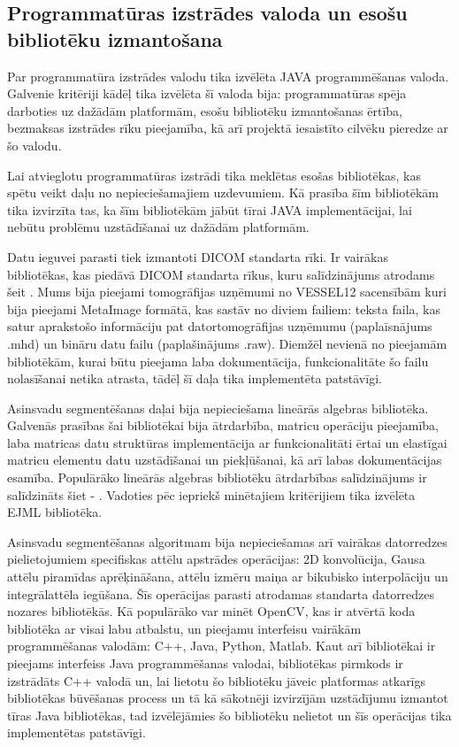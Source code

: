 \subsection{Programmatūras izstrādes valoda un esošu bibliotēku izmantošana}

Par programmatūra izstrādes valodu tika izvēlēta JAVA programmēšanas valoda. Galvenie kritēriji kādēļ tika izvēlēta šī valoda bija: programmatūras spēja darboties uz dažādām platformām, esošu bibliotēku izmantošanas ērtība, bezmaksas izstrādes rīku pieejamība, kā arī projektā iesaistīto cilvēku pieredze ar šo valodu.

Lai atvieglotu programmatūras izstrādi tika meklētas esošas bibliotēkas, kas spētu veikt daļu no nepieciešamajiem uzdevumiem. Kā prasība šīm bibliotēkām tika izvirzīta tas, ka šīm bibliotēkām jābūt tīrai JAVA implementācijai, lai nebūtu problēmu uzstādīšanai uz dažādām platformām.

Datu ieguvei parasti tiek izmantoti DICOM standarta rīki. Ir vairākas bibliotēkas, kas piedāvā DICOM standarta rīkus, kuru salīdzinājums atrodams šeit \cite{dicombibcomp}. Mums bija pieejami tomogrāfijas uzņēmumi no VESSEL12 sacensībām kuri bija pieejami MetaImage formātā, kas sastāv no diviem failiem: teksta faila, kas satur aprakstošo informāciju pat datortomogrāfijas uzņēmumu (paplaīsnājums .mhd) un bināru datu failu (paplašinājums .raw). Diemžēl nevienā no pieejamām bibliotēkām, kurai būtu pieejama laba dokumentācija, funkcionalitāte šo failu nolasīšanai netika atrasta, tādēļ šī daļa tika implementēta patstāvīgi.

Asinsvadu segmentēšanas daļai bija nepieciešama lineārās algebras bibliotēka. Galvenās prasības šai bibliotēkai bija ātrdarbība, matricu operāciju pieejamība, laba matricas datu struktūras implementācija ar funkcionalitāti ērtai un elastīgai matricu elementu datu uzstādīšanai un piekļūšanai, kā arī labas dokumentācijas esamība. Populārāko lineārās algebras bibliotēku ātrdarbības salīdzinājums ir salīdzināts šiet - \cite{linearlibcomp}. Vadoties pēc iepriekš minētajiem kritērijiem tika izvēlēta EJML\cite{ejml} bibliotēka.

Asinsvadu segmentēšanas algoritmam bija nepieciešamas arī vairākas datorredzes pielietojumiem specifiskas attēlu apstrādes operācijas: 2D konvolūcija, Gausa attēlu piramīdas aprēķināšana, attēlu izmēru maiņa ar bikubisko interpolāciju un integrālattēla iegūšana. Šīs operācijas parasti atrodamas standarta datorredzes nozares bibliotēkās. Kā populārāko var minēt OpenCV\cite{opencv}, kas ir atvērtā koda bibliotēka ar visai labu atbalstu, un pieejamu interfeisu vairākām programmēšanas valodām: C++, Java, Python, Matlab. Kaut arī bibliotēkai ir pieejams interfeiss Java programmēšanas valodai, bibliotēkas pirmkods ir izstrādāts C++ valodā un, lai lietotu šo bibliotēku jāveic platformas atkarīgs bibliotēkas būvēšanas process un tā kā sākotnēji izvirzījām uzstādījumu izmantot tīras Java bibliotēkas, tad izvēlējāmies šo bibliotēku nelietot un šīs operācijas tika implementētas patstāvīgi.

